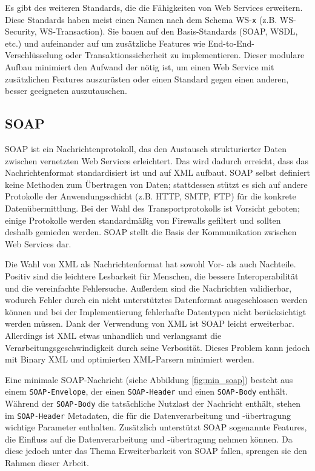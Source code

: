 \documentclass[runningheads]{llncs}
\newcommand{\germanquote}[1]{\glqq{}#1\grqq{}}
\begin{document}
    Es gibt des weiteren Standards, die die Fähigkeiten von Web Services erweitern. Diese Standards
    haben meist einen Namen nach dem Schema \germanquote{WS-\texttt{x}} (z.B. WS-Security,
    WS-Transaction). Sie bauen auf den Basis-Standards (SOAP, WSDL, etc.) und aufeinander auf um
    zusätzliche Features wie End-to-End-Verschlüsselung oder Transaktionssicherheit zu
    implementieren. Dieser modulare Aufbau minimiert den Aufwand der nötig ist, um einen Web
    Service mit zusätzlichen Features auszurüsten oder einen Standard gegen einen anderen, besser
    geeigneten auszutauschen.

  \label{soap}
  \subsection{SOAP}
  \nocite{wfm_site}
  \nocite{wk_soap}
    SOAP ist ein Nachrichtenprotokoll, das den Austausch strukturierter Daten zwischen vernetzten
    Web Services erleichtert. Das wird dadurch erreicht, dass das Nachrichtenformat standardisiert
    ist und auf XML aufbaut. SOAP selbst definiert keine Methoden zum Übertragen von Daten;
    stattdessen stützt es sich auf andere Protokolle der Anwendungsschicht (z.B. HTTP, SMTP, FTP)
    für die konkrete Datenübermittlung. Bei der Wahl des Transportprotokolls ist Vorsicht geboten;
    einige Protokolle werden standardmäßig von Firewalls gefiltert und sollten deshalb gemieden
    werden. SOAP stellt die Basis der Kommunikation zwischen Web Services dar.

    Die Wahl von XML als Nachrichtenformat hat sowohl Vor- als auch Nachteile. Positiv sind die
    leichtere Lesbarkeit für Menschen, die bessere Interoperabilität und die vereinfachte
    Fehlersuche. Außerdem sind die Nachrichten validierbar, wodurch Fehler durch ein nicht
    unterstütztes Datenformat ausgeschlossen werden können und bei der Implementierung fehlerhafte
    Datentypen nicht berücksichtigt werden müssen. Dank der Verwendung von XML ist SOAP leicht
    erweiterbar. Allerdings ist XML etwas unhandlich und verlangsamt die
    Verarbeitungsgeschwindigkeit durch seine Verbosität. Dieses Problem kann jedoch mit Binary XML
    und optimierten XML-Parsern minimiert werden.

    Eine minimale SOAP-Nachricht (siehe Abbildung \ref{fig:min_soap}) besteht aus einem
    \texttt{SOAP-\linebreak[0]Envelope}, der einen \texttt{SOAP-\linebreak[0]Header} und einen
    \texttt{SOAP-\linebreak[0]Body} enthält. Während der \texttt{SOAP-\linebreak[0]Body} die
    tatsächliche Nutzlast der Nachricht enthält, stehen im \texttt{SOAP-\linebreak[0]Header}
    Metadaten, die für die Datenverarbeitung und -übertragung wichtige Parameter enthalten.
    Zusätzlich unterstützt SOAP sogenannte \germanquote{Features}, die Einfluss auf die
    Datenverarbeitung und -übertragung nehmen können. Da diese jedoch unter das Thema
    \germanquote{Erweiterbarkeit von SOAP} fallen, sprengen sie den Rahmen dieser Arbeit.
\end{document}

